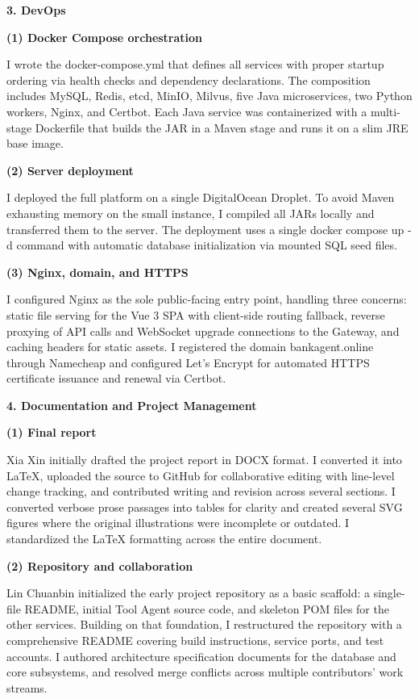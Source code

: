 \textbf{3. DevOps}

\textbf{(1) Docker Compose orchestration}

I wrote the docker-compose.yml that defines all services with proper startup ordering via health checks and dependency declarations. The composition includes MySQL, Redis, etcd, MinIO, Milvus, five Java microservices, two Python workers, Nginx, and Certbot. Each Java service was containerized with a multi-stage Dockerfile that builds the JAR in a Maven stage and runs it on a slim JRE base image.

\textbf{(2) Server deployment}

I deployed the full platform on a single DigitalOcean Droplet. To avoid Maven exhausting memory on the small instance, I compiled all JARs locally and transferred them to the server. The deployment uses a single docker compose up -d command with automatic database initialization via mounted SQL seed files.

\textbf{(3) Nginx, domain, and HTTPS}

I configured Nginx as the sole public-facing entry point, handling three concerns: static file serving for the Vue 3 SPA with client-side routing fallback, reverse proxying of API calls and WebSocket upgrade connections to the Gateway, and caching headers for static assets. I registered the domain bankagent.online through Namecheap and configured Let's Encrypt for automated HTTPS certificate issuance and renewal via Certbot.

\textbf{4. Documentation and Project Management}

\textbf{(1) Final report}

Xia Xin initially drafted the project report in DOCX format. I converted it into LaTeX, uploaded the source to GitHub for collaborative editing with line-level change tracking, and contributed writing and revision across several sections. I converted verbose prose passages into tables for clarity and created several SVG figures where the original illustrations were incomplete or outdated. I standardized the LaTeX formatting across the entire document.

\textbf{(2) Repository and collaboration}

Lin Chuanbin initialized the early project repository as a basic scaffold: a single-file README, initial Tool Agent source code, and skeleton POM files for the other services. Building on that foundation, I restructured the repository with a comprehensive README covering build instructions, service ports, and test accounts. I authored architecture specification documents for the database and core subsystems, and resolved merge conflicts across multiple contributors' work streams.

